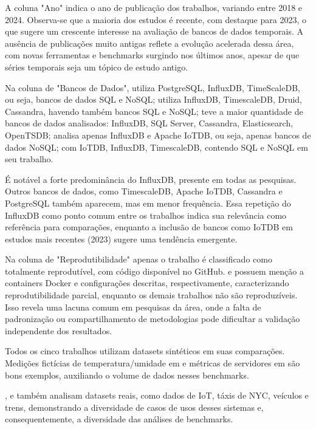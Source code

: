 A coluna "Ano" indica o ano de publicação dos trabalhos, variando entre 2018 e 2024. Observa-se que a maioria dos estudos é recente, com destaque para 2023, o que sugere um crescente interesse na avaliação de bancos de dados temporais. A ausência de publicações muito antigas reflete a evolução acelerada dessa área, com novas ferramentas e benchmarks surgindo nos últimos anos, apesar de que séries temporais seja um tópico de estudo antigo.

Na coluna de "Bancos de Dados",  utiliza PostgreSQL, InfluxDB, TimeScaleDB, ou seja, bancos de dados SQL e NoSQL;  utiliza InfluxDB, TimescaleDB, Druid, Cassandra, havendo também bancos SQL e NoSQL;  teve a maior quantidade de bancos de dados analisados: InfluxDB, SQL Server, Cassandra, Elasticsearch, OpenTSDB;  analisa apenas InfluxDB e Apache IoTDB, ou seja, apenas bancos de dados NoSQL;  com IoTDB, InfluxDB, TimescaleDB, contendo SQL e NoSQL em seu trabalho.

É notável a forte predominância do InfluxDB, presente em todas as pesquisas. Outros bancos de dados, como TimescaleDB, Apache IoTDB, Cassandra e PostgreSQL também aparecem, mas em menor frequência. Essa repetição do InfluxDB como ponto comum entre os trabalhos indica sua relevância como referência para comparações, enquanto a inclusão de bancos como IoTDB em estudos mais recentes (2023) sugere uma tendência emergente.

Na coluna de "Reprodutibilidade" apenas o trabalho  é classificado como totalmente reprodutível, com código disponível no GitHub.  e  possuem menção a containers Docker e configurações descritas, respectivamente, caracterizando reprodutibilidade parcial, enquanto os demais trabalhos não são reproduzíveis. Isso revela uma lacuna comum em pesquisas da área, onde a falta de padronização ou compartilhamento de metodologias pode dificultar a validação independente dos resultados.

Todos os cinco trabalhos utilizam datasets sintéticos em suas comparações. Medições fictícias de temperatura/umidade em  e métricas de servidores em  são bons exemplos, auxiliando o volume de dados nesses benchmarks.

,  e  também analisam datasets reais, como dados de IoT, táxis de NYC, veículos e trens, demonstrando a diversidade de casos de usos desses sistemas e, consequentemente, a diversidade das análises de benchmarks.

